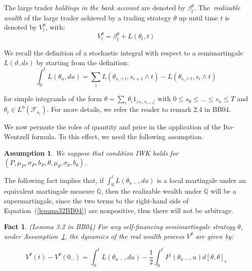 \documentclass{article}
\newtheorem{assumption}[theorem]{Assumption}
\newtheorem{fact}[theorem]{Fact}
\begin{document}
The large trader \textit{holdings in the bank account} are denoted by $\beta
_{t}^{\theta }$. The\textit{\ realizable wealth} of the large trader
achieved by a trading strategy $\theta $ up until time $t$ is denoted by $%
V_{t}^{\theta }$, with:%
\begin{equation*}
V_{t}^{\theta }=\beta _{t}^{\theta }+L(\theta _{t},t)
\end{equation*}

We recall the definition of a stochastic integral with respect to a
semimartingale $L(\vartheta ,ds)$ by starting from the definition:%
\begin{equation*}
\int_{0}^{t}L(\theta _{u},du)=\sum_{i}L(\theta _{s_{i}\wedge
t},s_{i+1}\wedge t)-L(\theta _{s_{i}\wedge t},s_{i}\wedge t)
\end{equation*}

for simple integrands of the form $\theta =\sum_{i}\theta
_{i}1_{(s_{i},s_{i+1}]}$ with $0\leq s_{0}\leq ...\leq s_{n}\leq T$ and $%
\theta _{i}\in L^{0}(\mathcal{F}_{s_{i}})$. For more details, we refer the
reader to remark 2.4 in BB04.

\bigskip

We now permute the roles of quantity and price in the application of the
Ito-Wentzell formula. To this effect, we need the following assumption.


\begin{assumption} \label{ass::iwk_condition_P}
We suppose that condition IWK holds for $(P,\mu _{P},\sigma
_{P},b_{P},\theta ,\mu _{\theta },\sigma _{\theta },b_{\theta })$.\bigskip
\end{assumption}

The following fact implies that, if $\int_{0}^{t}L(\theta _{u-},du)$ is a
local martingale under an equivalent martingale measure $\mathbb{Q}$, then
the realizable wealth under $\mathbb{Q}$ will be a supermartingale, since
the two terms to the right-hand side of Equation~(\ref{lemma32BB04}) are 
nonpositive, thus there will not be arbitrage.


\begin{fact}
(Lemma 3.2 in BB04) For any self-financing semimartingale
strategy $\theta $, under Assumption~\ref{ass::iwk_condition_P}, the dynamics of the real wealth
process $V^{\theta }$ are given by:
\end{fact}

\begin{equation}
V^{\theta }(t)-V^{\theta }(0_{-})=\int_{0}^{t}L(\theta _{u-},du)-\frac{1}{2}%
\int_{0}^{t}P^{\prime }(\theta _{u-},u)d[\theta ,\theta ]_{s}
\label{lemma32BB04}
\end{equation}%
\bigskip
\end{document}

